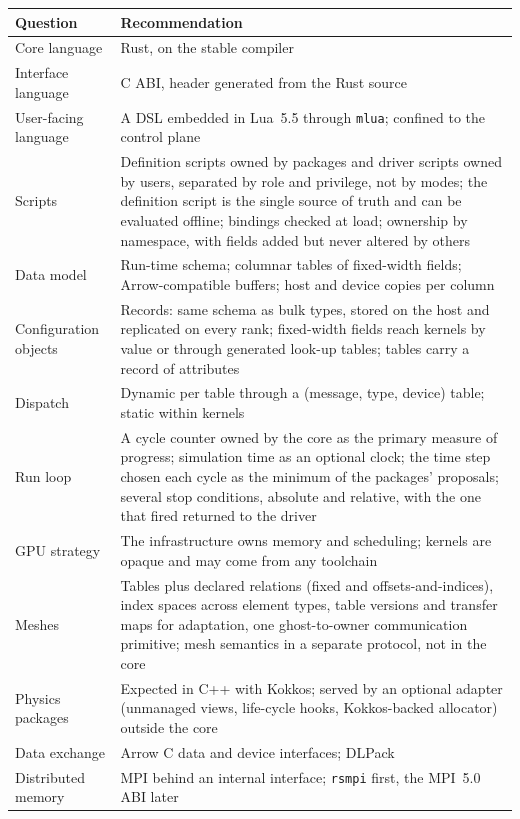 \documentclass[11pt,a4paper]{article}
\newcommand{\code}[1]{\texttt{#1}}
\begin{document}
{\small
\begin{xltabular}{\textwidth}{@{}>{\raggedright\arraybackslash}p{32mm} L@{}}
\toprule
Question & Recommendation \\
\midrule
\endhead
\bottomrule
\endfoot
Core language & Rust, on the stable compiler \\
Interface language & C ABI, header generated from the Rust source \\
User-facing language & A DSL embedded in Lua~5.5 through \code{mlua}; confined to the control plane \\
Scripts & Definition scripts owned by packages and driver scripts owned by users, separated by role and privilege, not by modes; the definition script is the single source of truth and can be evaluated offline; bindings checked at load; ownership by namespace, with fields added but never altered by others \\
Data model & Run-time schema; columnar tables of fixed-width fields; Arrow-compatible buffers; host and device copies per column \\
Configuration objects & Records: same schema as bulk types, stored on the host and replicated on every rank; fixed-width fields reach kernels by value or through generated look-up tables; tables carry a record of attributes \\
Dispatch & Dynamic per table through a (message, type, device) table; static within kernels \\
Run loop & A cycle counter owned by the core as the primary measure of progress; simulation time as an optional clock; the time step chosen each cycle as the minimum of the packages' proposals; several stop conditions, absolute and relative, with the one that fired returned to the driver \\
GPU strategy & The infrastructure owns memory and scheduling; kernels are opaque and may come from any toolchain \\
Meshes & Tables plus declared relations (fixed and offsets-and-indices), index spaces across element types, table versions and transfer maps for adaptation, one ghost-to-owner communication primitive; mesh semantics in a separate protocol, not in the core \\
Physics packages & Expected in C++ with Kokkos; served by an optional adapter (unmanaged views, life-cycle hooks, Kokkos-backed allocator) outside the core \\
Data exchange & Arrow C data and device interfaces; DLPack \\
Distributed memory & MPI behind an internal interface; \code{rsmpi} first, the MPI~5.0 ABI later \\

\end{xltabular}}
\end{document}

